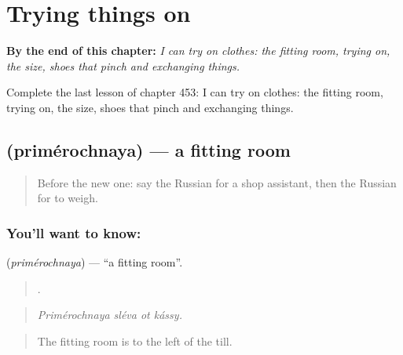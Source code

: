 
\chapter{Trying things on}
\label{ch:ru-trying-things-on}

\begin{chapteropening}
\textbf{By the end of this chapter:} \emph{I can try on clothes: the fitting room, trying on, the size, shoes that pinch and exchanging things.}

Complete the last lesson of chapter 453: I can try on clothes: the fitting room, trying on, the size, shoes that pinch and exchanging things.
\end{chapteropening}

\section[\texorpdfstring{\ru{примерочная} (primérochnaya)}{примерочная (primérochnaya)}]{ (primérochnaya) — a fitting room}

\label{lesson:RU-C453-primerochnaya}



\begin{quote}
Before the new one: say the Russian for a shop assistant, then the Russian for to weigh.
\end{quote}

\subsection*{You'll want to know: }
\textbf{} (\emph{primérochnaya}) — \textquotedblleft{}a fitting room\textquotedblright{}.

\begin{quote}
   .
\end{quote}

\begin{quote}
\emph{Primérochnaya sléva ot kássy.}
\end{quote}

\begin{quote}
The fitting room is to the left of the till.
\end{quote}

